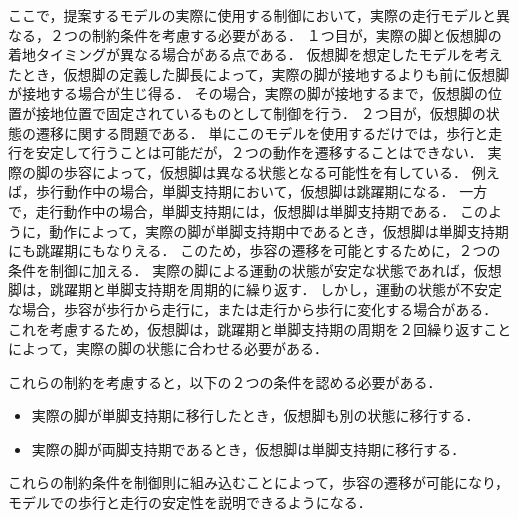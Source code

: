 ここで，提案するモデルの実際に使用する制御において，実際の走行モデルと異なる，２つの制約条件を考慮する必要がある．
１つ目が，実際の脚と仮想脚の着地タイミングが異なる場合がある点である．
仮想脚を想定したモデルを考えたとき，仮想脚の定義した脚長によって，実際の脚が接地するよりも前に仮想脚が接地する場合が生じ得る．
その場合，実際の脚が接地するまで，仮想脚の位置が接地位置で固定されているものとして制御を行う．
２つ目が，仮想脚の状態の遷移に関する問題である．
単にこのモデルを使用するだけでは，歩行と走行を安定して行うことは可能だが，２つの動作を遷移することはできない．
実際の脚の歩容によって，仮想脚は異なる状態となる可能性を有している．
例えば，歩行動作中の場合，単脚支持期において，仮想脚は跳躍期になる．
一方で，走行動作中の場合，単脚支持期には，仮想脚は単脚支持期である．
このように，動作によって，実際の脚が単脚支持期中であるとき，仮想脚は単脚支持期にも跳躍期にもなりえる．
このため，歩容の遷移を可能とするために，２つの条件を制御に加える．
実際の脚による運動の状態が安定な状態であれば，仮想脚は，跳躍期と単脚支持期を周期的に繰り返す．
しかし，運動の状態が不安定な場合，歩容が歩行から走行に，または走行から歩行に変化する場合がある．
これを考慮するため，仮想脚は，跳躍期と単脚支持期の周期を２回繰り返すことによって，実際の脚の状態に合わせる必要がある．

これらの制約を考慮すると，以下の２つの条件を認める必要がある．

\begin{itemize}
 \item[\labelitemiv] 実際の脚が単脚支持期に移行したとき，仮想脚も別の状態に移行する．
 \item[\labelitemiv] 実際の脚が両脚支持期であるとき，仮想脚は単脚支持期に移行する．
\end{itemize}

これらの制約条件を制御則に組み込むことによって，歩容の遷移が可能になり，モデルでの歩行と走行の安定性を説明できるようになる．


